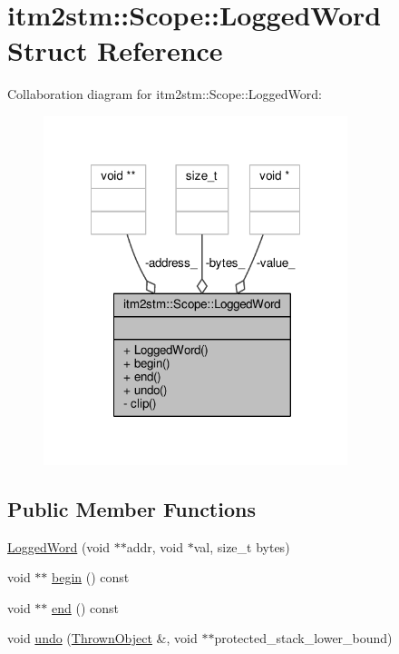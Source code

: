 \hypertarget{structitm2stm_1_1Scope_1_1LoggedWord}{\section{itm2stm\-:\-:Scope\-:\-:Logged\-Word Struct Reference}
\label{structitm2stm_1_1Scope_1_1LoggedWord}
}


Collaboration diagram for itm2stm\-:\-:Scope\-:\-:Logged\-Word\-:
\nopagebreak
\begin{figure}[H]
\begin{center}
\leavevmode
\includegraphics[width=251pt]{structitm2stm_1_1Scope_1_1LoggedWord__coll__graph}
\end{center}
\end{figure}
\subsection*{Public Member Functions}
\begin{DoxyCompactItemize}
\item 
\hyperlink{structitm2stm_1_1Scope_1_1LoggedWord_a9fd1090bc58044f65f9c5b11060d52e8}{Logged\-Word} (void $\ast$$\ast$addr, void $\ast$val, size\-\_\-t bytes)
\item 
void $\ast$$\ast$ \hyperlink{structitm2stm_1_1Scope_1_1LoggedWord_af69b02157266eadd47ff96b63c28fff2}{begin} () const 
\item 
void $\ast$$\ast$ \hyperlink{structitm2stm_1_1Scope_1_1LoggedWord_a922742445114011b09a448c5ec52788c}{end} () const 
\item 
void \hyperlink{structitm2stm_1_1Scope_1_1LoggedWord_a1d4b21645a98313919db8436c3088728}{undo} (\hyperlink{structitm2stm_1_1Scope_1_1ThrownObject}{Thrown\-Object} \&, void $\ast$$\ast$protected\-\_\-stack\-\_\-lower\-\_\-bound)
\end{DoxyCompactItemize}
